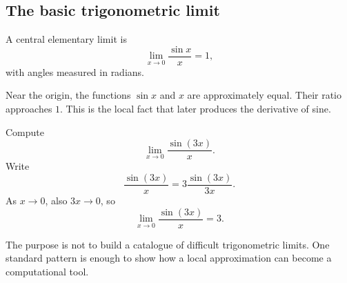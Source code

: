 \subsection{The basic trigonometric limit}

A central elementary limit is
\[
\lim_{x\to0}\frac{\sin x}{x}=1,
\]
with angles measured in radians.

\begin{interpretationbox}
Near the origin, the functions \(\sin x\) and \(x\) are approximately equal. Their ratio approaches \(1\). This is the local fact that later produces the derivative of sine.
\end{interpretationbox}

\begin{examplebox}
Compute
\[
\lim_{x\to0}\frac{\sin(3x)}{x}.
\]
Write
\[
\frac{\sin(3x)}{x}
=3\frac{\sin(3x)}{3x}.
\]
As \(x\to0\), also \(3x\to0\), so
\[
\lim_{x\to0}\frac{\sin(3x)}{x}=3.
\]
\end{examplebox}

\begin{remarkbox}
The purpose is not to build a catalogue of difficult trigonometric limits. One standard pattern is enough to show how a local approximation can become a computational tool.
\end{remarkbox}
